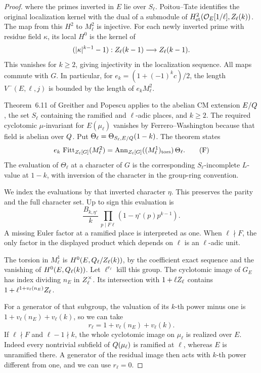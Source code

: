 \begin{proof}
where the primes inverted in \(E\) lie over \(S_\ell\).
Poitou--Tate identifies the original localization kernel with
the dual of a submodule of \(H^2_{\rm et}(\mathcal O_E[1/\ell],
Z_\ell(k))\). The map from this \(H^2\) to \(M_\ell^2\)
is injective. For each newly inverted prime with residue field \(\kappa\), its
local \(H^0\) is the kernel of
\[
      (|\kappa|^{k-1}-1):Z_\ell(k-1)\longrightarrow Z_\ell(k-1).
\]
This vanishes for \(k\ge2\), giving injectivity in the localization
sequence.
All maps commute with \(G\). In particular, for
\(e_k=(1+(-1)^k c)/2\), the length \(V^-(E,\ell,j)\) is
bounded by the length of \(e_k M_\ell^2\).

Theorem~6.11 of Greither and Popescu applies to the abelian
CM extension \(E/Q\), the set \(S_\ell\) containing the
ramified and \(\ell\)-adic places, and \(k\ge2\).
The required cyclotomic \(\mu\)-invariant for \(E(\mu_\ell)\)
vanishes by Ferrero--Washington because that field is abelian
over \(Q\). Put \(\Theta_\ell=\Theta_{S_\ell,E/Q}(1-k)\).
The theorem states
\[
 e_k\,\operatorname{Fitt}_{Z_\ell[G]}(M_\ell^2)
   = \operatorname{Ann}_{Z_\ell[G]}((M_\ell^1)_{\rm tors})
       \,\Theta_\ell .
 \tag{F}\label{eq:local-odd-f}
\]
The evaluation of \(\Theta_\ell\) at a character of \(G\) is
the corresponding \(S_\ell\)-incomplete \(L\)-value at \(1-k\),
with inversion of the character in the group-ring convention.

We index the evaluations by that inverted character \(\eta\).
This preserves the parity and the full character set. Up to
sign this evaluation is
\[
 \frac{B_{k,\eta^\circ}}{k}\,
     \prod_{p\mid F\ell}(1-\eta^\circ(p)p^{k-1}).
\]
A missing Euler factor at a ramified place is interpreted as
one. When \(\ell\nmid F\), the only factor in the displayed
product which depends on \(\ell\) is an \(\ell\)-adic unit.
\hfill\mbox{\cite{greither-popescu}}


The torsion in \(M_\ell^1\) is \(H^0(E,Q_\ell/Z_\ell(k))\),
by the coefficient exact sequence and the vanishing of
\(H^0(E,Q_\ell(k))\). Let \(\ell^{r_\ell}\) kill this group.
The cyclotomic image of \(G_E\) has index dividing \(n_E\)
in \(Z_\ell^\times\). Its intersection with
\(1+\ell Z_\ell\) contains \(1+\ell^{1+v_\ell(n_E)}Z_\ell\).

For a generator of that subgroup, the valuation of its \(k\)-th
power minus one is \(1+v_\ell(n_E)+v_\ell(k)\), so we can take
\[
                 r_\ell=1+v_\ell(n_E)+v_\ell(k).
\]
If \(\ell\nmid F\) and \(\ell-1\nmid k\), the whole cyclotomic
image on \(\mu_\ell\) is realized over \(E\). Indeed every
nontrivial subfield of \(Q(\mu_\ell)\) is ramified at
\(\ell\), whereas \(E\) is unramified there. A generator of the
residual image then acts with \(k\)-th power different from
one, and we can use \(r_\ell=0\).


\end{proof}
